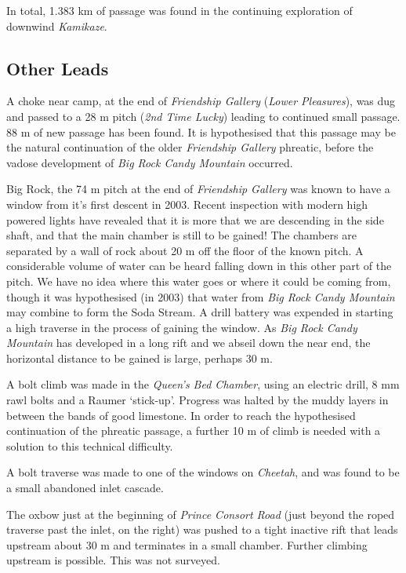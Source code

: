 In total, 1.383 km of passage was found in the continuing exploration of
downwind \emph{Kamikaze}.

\hypertarget{other-leads}{%
\subsection{Other Leads}\label{other-leads}}

A choke near camp, at the end of \emph{Friendship Gallery} (\emph{Lower
Pleasures}), was dug and passed to a 28 m pitch (\emph{2nd Time Lucky})
leading to continued small passage. 88 m of new passage has been found.
It is hypothesised that this passage may be the natural continuation of
the older \emph{Friendship Gallery} phreatic, before the vadose
development of \emph{Big Rock Candy Mountain} occurred.

Big Rock, the 74 m pitch at the end of \emph{Friendship Gallery} was
known to have a window from it's first descent in 2003. Recent
inspection with modern high powered lights have revealed that it is more
that we are descending in the side shaft, and that the main chamber is
still to be gained! The chambers are separated by a wall of rock about
20 m off the floor of the known pitch. A considerable volume of water
can be heard falling down in this other part of the pitch. We have no
idea where this water goes or where it could be coming from, though it
was hypothesised (in 2003) that water from \emph{Big Rock Candy
Mountain} may combine to form the Soda Stream. A drill battery was
expended in starting a high traverse in the process of gaining the
window. As \emph{Big Rock Candy Mountain} has developed in a long rift
and we abseil down the near end, the horizontal distance to be gained is
large, perhaps 30 m.

A bolt climb was made in the \emph{Queen's Bed Chamber}, using an
electric drill, 8 mm rawl bolts and a Raumer `stick-up'. Progress was
halted by the muddy layers in between the bands of good limestone. In
order to reach the hypothesised continuation of the phreatic passage, a
further 10 m of climb is needed with a solution to this technical
difficulty.

A bolt traverse was made to one of the windows on \emph{Cheetah}, and
was found to be a small abandoned inlet cascade.

The oxbow just at the beginning of \emph{Prince Consort Road} (just
beyond the roped traverse past the inlet, on the right) was pushed to a
tight inactive rift that leads upstream about 30 m and terminates in a
small chamber. Further climbing upstream is possible. This was not
surveyed.

